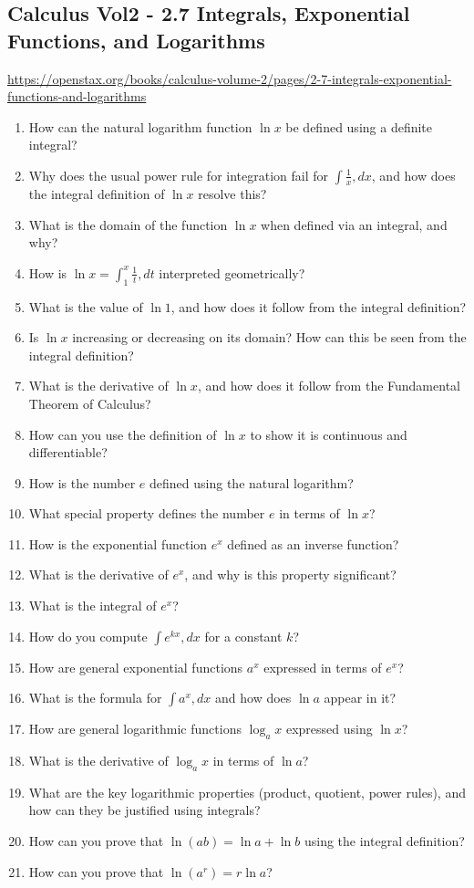 \subsection{Calculus Vol2 - 2.7 Integrals, Exponential Functions, and Logarithms}

\url{https://openstax.org/books/calculus-volume-2/pages/2-7-integrals-exponential-functions-and-logarithms}

\begin{enumerate}
  \item How can the natural logarithm function \(\ln x\) be defined using a definite integral?
  \item Why does the usual power rule for integration fail for \(\int \frac{1}{x},dx\), and how does the integral definition of \(\ln x\) resolve this?
  \item What is the domain of the function \(\ln x\) when defined via an integral, and why?
  \item How is \(\ln x = \int_{1}^{x} \frac{1}{t},dt\) interpreted geometrically?
  \item What is the value of \(\ln 1\), and how does it follow from the integral definition?
  \item Is \(\ln x\) increasing or decreasing on its domain? How can this be seen from the integral definition?
  \item What is the derivative of \(\ln x\), and how does it follow from the Fundamental Theorem of Calculus?
  \item How can you use the definition of \(\ln x\) to show it is continuous and differentiable?
  \item How is the number \(e\) defined using the natural logarithm?
  \item What special property defines the number \(e\) in terms of \(\ln x\)?
  \item How is the exponential function \(e^{x}\) defined as an inverse function?
  \item What is the derivative of \(e^{x}\), and why is this property significant?
  \item What is the integral of \(e^{x}\)?
  \item How do you compute \(\int e^{kx},dx\) for a constant \(k\)?
  \item How are general exponential functions \(a^{x}\) expressed in terms of \(e^{x}\)?
  \item What is the formula for \(\int a^{x},dx\) and how does \(\ln a\) appear in it?
  \item How are general logarithmic functions \(\log_{a} x\) expressed using \(\ln x\)?
  \item What is the derivative of \(\log_{a} x\) in terms of \(\ln a\)?
  \item What are the key logarithmic properties (product, quotient, power rules), and how can they be justified using integrals?
  \item How can you prove that \(\ln(ab) = \ln a + \ln b\) using the integral definition?
  \item How can you prove that \(\ln(a^{r}) = r \ln a\)?
\end{enumerate}

